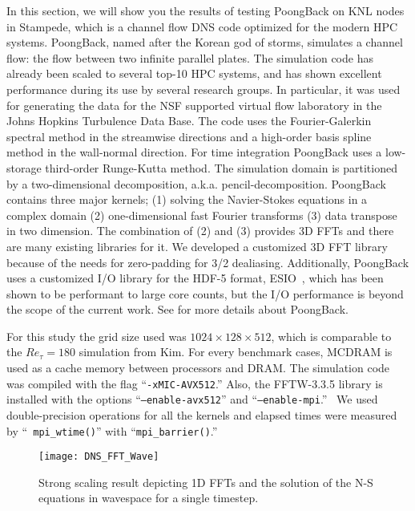 In this section, we will show you the results of testing PoongBack on
KNL nodes in Stampede, which is a channel flow DNS code optimized for
the modern HPC systems. PoongBack,
named after the Korean god of storms, 
simulates a channel flow: the flow between two infinite 
parallel plates. The simulation code
has already been scaled to several top-10 HPC systems, and has 
shown excellent performance during its use by several research 
groups\cite{Lee:2013kv}. In particular, it was used for
generating the data for the NSF supported virtual flow laboratory in the 
Johns Hopkins Turbulence Data Base\cite{Graham:2015ha}.
The code uses the Fourier-Galerkin spectral method in the streamwise directions 
and a high-order basis spline method in the wall-normal direction. 
For time integration PoongBack uses a low-storage
third-order Runge-Kutta method\cite{}. 
The simulation domain is partitioned by
a two-dimensional decomposition, a.k.a. pencil-decomposition. PoongBack
contains three major kernels; (1) solving the Navier-Stokes equations in
a complex domain (2) one-dimensional fast Fourier transforms (3)
data transpose in two dimension. The combination of (2) and (3) provides 3D
FFTs and there are many existing libraries for it. We developed a customized 3D
FFT library because of the needs for zero-padding for 3/2
dealiasing. Additionally, PoongBack uses a customized I/O library for the HDF-5
format, ESIO~\cite{Lee:2014ta}, which has been shown to be performant to 
large core counts, but the I/O performance is beyond the scope of the current work. 
See \cite{Lee:2013kv,Lee:2014ta} for more details about PoongBack.  

For this study the grid size used was $1024\times128\times512$, which is 
comparable to the $Re_\tau = 180$ simulation from 
Kim\cite{Kim:1987ub}. For every benchmark cases, MCDRAM is
used as a cache memory between processors and DRAM. The simulation code
was compiled with the flag ``{\tt -xMIC-AVX512}.'' Also, the FFTW-3.3.5
library is installed with the options ``{\tt --enable-avx512}'' and
``{\tt --enable-mpi}.''~\cite{Frigo:2005tu} We used double-precision
operations for all the kernels and elapsed times were measured by ``{\tt
mpi\_wtime()}'' with ``{\tt mpi\_barrier()}.'' 

\begin{figure}
 \begin{center}
   \texttt{[image: DNS\_FFT\_Wave]}
   \caption{Strong scaling result depicting 1D FFTs and the solution of the 
  N-S equations in wavespace for a single timestep.}
   \label{fig:DNS_strong_scale_fft_wave}
 \end{center}
\end{figure}

